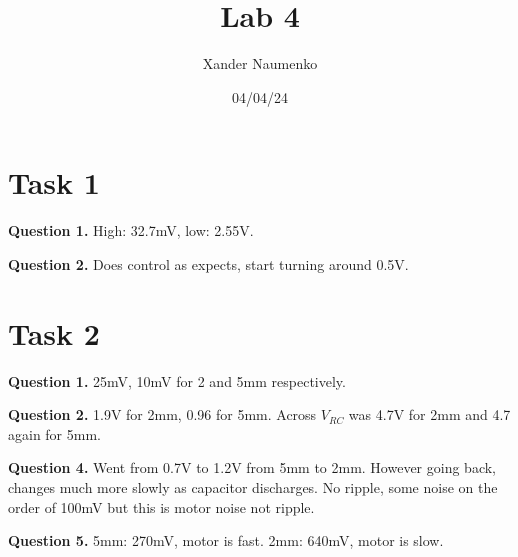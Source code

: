 \documentclass[letterpaper, reqno,11pt]{article}
\begin{document}
\title{Lab 4}
\date{04/04/24}
\author{Xander Naumenko}
\maketitle

\section{Task 1}
{\medskip\noindent\bf Question 1.} High: 32.7mV, low: 2.55V.

{\medskip\noindent\bf Question 2.} Does control as expects, start turning around 0.5V.

\section{Task 2}

{\medskip\noindent\bf Question 1.} 25mV, 10mV for 2 and 5mm respectively.

{\medskip\noindent\bf Question 2.} 1.9V for 2mm, 0.96 for 5mm. Across $V_{RC}$ was 4.7V for 2mm and 4.7 again for 5mm.

{\medskip\noindent\bf Question 4.} Went from 0.7V to 1.2V from 5mm to 2mm. However going back, changes much more slowly as capacitor discharges. No ripple, some noise on the order of 100mV but this is motor noise not ripple.

{\medskip\noindent\bf Question 5.} 5mm: 270mV, motor is fast. 2mm: 640mV, motor is slow.
\end{document}
